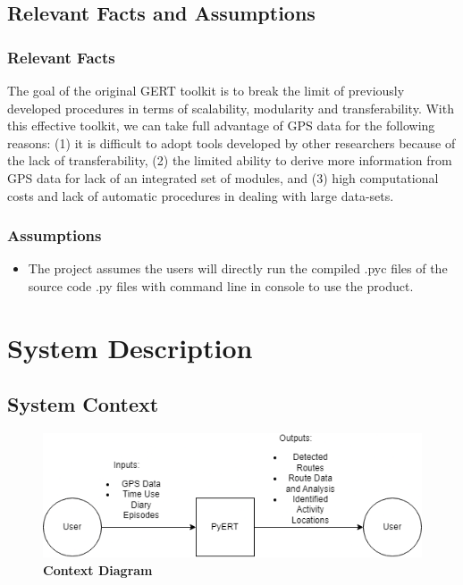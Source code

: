 \documentclass[12pt, titlepage]{article}
\begin{document}
\subsection{Relevant Facts and Assumptions}

\subsubsection{Relevant Facts}
The goal of the original GERT toolkit is to break the limit of previously developed procedures in terms of scalability, modularity and transferability. With this effective toolkit, we can take full advantage of GPS data for the following reasons: (1) it is difficult to adopt tools developed by other researchers because of the lack of transferability, (2) the limited ability to derive more information from GPS data for lack of an integrated set of modules, and (3) high computational costs and lack of automatic procedures in dealing with large data-sets. 

\subsubsection{Assumptions}
\begin{itemize}
    \item The project assumes the users will directly run the compiled .pyc files of the source code .py files with command line in console to use the product.
\end{itemize}

\section{System Description}

\subsection{System Context}

\begin{figure}[!htbp]
    \centering
    \includegraphics[scale=0.75]{contextdiagram.png}
    \caption{\bf Context Diagram}
\end{figure}
\end{document}

